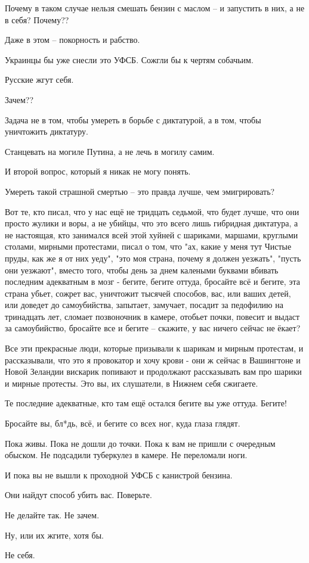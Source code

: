 Почему в таком случае нельзя смешать бензин с маслом – и запустить в них, а не
в себя? Почему??

Даже в этом – покорность и рабство.

Украинцы бы уже снесли это УФСБ. Сожгли бы к чертям собачьим.

Русские жгут себя.

Зачем??

Задача не в том, чтобы умереть в борьбе с диктатурой, а в том, чтобы уничтожить
диктатуру.

Станцевать на могиле Путина, а не лечь в могилу самим.

И второй вопрос, который я никак не могу понять.

Умереть такой страшной смертью – это правда лучше, чем эмигрировать?

Вот те, кто писал, что у нас ещё не тридцать седьмой, что будет лучше, что они
просто жулики и воры, а не убийцы, что это всего лишь гибридная диктатура, а не
настоящая, кто занимался всей этой хуйней с шариками, маршами, круглыми
столами, мирными протестами, писал о том, что "ах, какие у меня тут Чистые
пруды, как же я от них уеду", "это моя страна, почему я должен уезжать", "пусть
они уезжают", вместо того, чтобы день за днем калеными буквами вбивать
последним адекватным в мозг - бегите, бегите оттуда, бросайте всё и бегите, эта
страна убьет, сожрет вас, уничтожит тысячей способов, вас, или ваших детей, или
доведет до самоубийства, запытает, замучает, посадит за педофилию на тринадцать
лет, сломает позвоночник в камере, отобьет почки, повесит и выдаст за
самоубийство, бросайте все и бегите – скажите, у вас ничего сейчас не ёкает?

Все эти прекрасные люди, которые призывали к шарикам и мирным протестам, и
рассказывали, что это я провокатор и хочу крови - они ж сейчас в Вашингтоне и
Новой Зеландии вискарик попивают и продолжают рассказывать вам про шарики и
мирные протесты. Это вы, их слушатели, в Нижнем себя сжигаете.

Те последние адекватные, кто там ещё остался бегите вы уже оттуда. Бегите!

Бросайте вы, бл*дь, всё, и бегите со всех ног, куда глаза глядят.

Пока живы. Пока не дошли до точки. Пока к вам не пришли с очередным обыском. Не
подсадили туберкулез в камере. Не переломали ноги.

И пока вы не вышли к проходной УФСБ с канистрой бензина.

Они найдут способ убить вас. Поверьте.

Не делайте так. Не зачем.

Ну, или их жгите, хотя бы.

Не себя.
